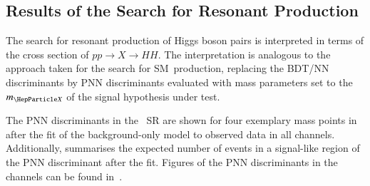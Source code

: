 \begin{table}[htbp]
  \centering

  \caption{Expected and observed upper limits on the the cross section of SM~\HH
    production via \ggF and VBF, \xsecggfvbf, and the SM~\HH signal strength,
    $\mu$, at \SI{95}{\percent}~CL using the \CLs method. The expected limits
    are obtained under the assumption of the background-only
    hypothesis.
    The table is adapted from Ref~\cite{HDBS-2018-40}.}%
  \label{tab:limits_non_resonant}

  
\end{table}


\subsection{Results of the Search for Resonant \HH Production}%
\label{sec:results_res}

The search for resonant production of Higgs boson pairs is interpreted in terms
of the cross section of $pp \to X \to HH$. The interpretation is analogous to
the approach taken for the search for SM~\HH production, replacing the BDT/NN
discriminants by PNN discriminants evaluated with mass parameters set to the
$\mX$ of the signal hypothesis under test.

The PNN discriminants in the \hadhad~SR are shown for four exemplary mass points
in~ after the fit of the background-only model to
observed data in all channels.  Additionally, 
summarises the expected number of events in a signal-like region of the PNN
discriminant after the fit. Figures of the PNN discriminants in the \lephad
channels can be found in~.

